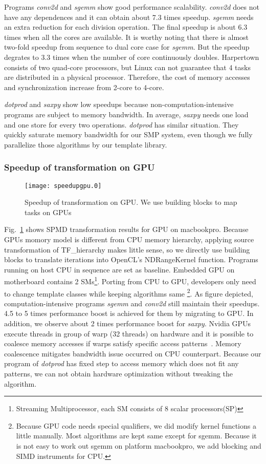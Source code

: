 Programs \textit{conv2d} and \textit{sgemm} show good performance scalability. \textit{conv2d} does not have any dependences
and it can obtain about 7.3 times speedup. \textit{sgemm}
needs an extra reduction for each division operation. The final
speedup is about 6.3 times when all the cores are available. It is
worthy noting that there is almost two-fold speedup from sequence to
dual core case for \textit{sgemm}. But
the speedup degrates to 3.3 times when the number of core continuously
doubles. Harpertown consists of two quad-core processors,  but Linux
can not guarantee that 4 tasks are distributed in a physical
processor. Therefore, the cost of memory accesses and synchronization
increase from 2-core to 4-core.

\textit{dotprod} and \textit{saxpy} show low speedups because non-computation-intensive
programs are subject to memory bandwidth.  In average, \textit{saxpy} needs one load and one 
store for every two operations. \textit{dotprod} has similar
situation. They quickly saturate memory bandwidth for our SMP system, even though we fully parallelize those
algorithms by our template library. 

\subsubsection{Speedup of  transformation on GPU}\label{exp:2}

\begin{figure}
\texttt{[image: speedupgpu.0]}
\caption{Speedup of transformation on GPU. We use building blocks to
  map tasks on GPUs}\label{fig:spdgpu}
\end{figure}

Fig.~\ref{fig:spdgpu} shows SPMD transformation results for GPU on
macbookpro. Because GPUs momory model is different from CPU memory
hierarchy, applying source transformation of TF\_hierarchy makes
little sense, so we directly use building
blocks to translate iterations into OpenCL's NDRangeKernel
function. Programs running on host CPU  in sequence are set as
baseline. Embedded GPU on motherboard contains 2
SMs\footnote{Streaming Multiprocessor, each SM consists of 8 scalar processors(SP)}.
Porting from CPU to GPU, developers only need to change
template classes while keeping algorithms same \footnote{
Because GPU code needs special qualifiers, we did modify kernel
functions a little manually.  Most algorithms are kept same except for
sgemm.  Because it is not easy
 to work out sgemm on platform macbookpro, we add blocking and SIMD
 instruments for CPU.}. As figure depicted,  computation-intensive programs
\textit{sgemm} and \textit{conv2d} still maintain their speedups. 4.5 to 5 times
performance boost is achieved for them by migrating to GPU.
In addition, we observe about 2 times performance boost for
\textit{saxpy}. Nvidia GPUs execute
threads in group of warp (32 threads) on hardware and it is
possible to coalesce memory accesses if warps satisfy
specific access patterns~\cite{nvopencl}. Memory coalescence mitigates bandwidth issue
occurred on CPU counterpart. Because our program of \textit{dotprod} has fixed
step to access memory which does not fit any patterns, we can not
obtain hardware optimization without tweaking the algorithm.

